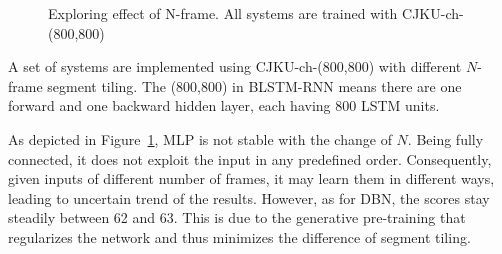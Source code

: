 \begin{figure}
\centering
{}
\caption{Exploring effect of N-frame. All systems are trained with CJKU-ch-(800,800)}
\label{fig:3-N-frame}
\end{figure}

A set of systems are implemented using CJKU-ch-(800,800) with different $N$-frame segment tiling. The (800,800) in BLSTM-RNN means there are one forward and one backward hidden layer, each having 800 LSTM units.

As depicted in Figure~\ref{fig:3-N-frame}, MLP is not stable with the change of $N$. Being fully connected, it does not exploit the input in any predefined order. Consequently, given inputs of different number of frames, it may learn them in different ways, leading to uncertain trend of the results. However, as for DBN, the scores stay steadily between 62 and 63. This is due to the generative pre-training that regularizes the network and thus minimizes the difference of segment tiling.


